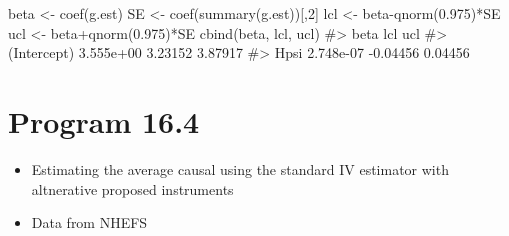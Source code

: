 \documentclass[
  10pt,
  a4paper,
]{book}
\newenvironment{Shaded}{\begin{snugshade}}{\end{snugshade}}
\newcommand{\CommentTok}[1]{\textcolor[rgb]{0.37,0.37,0.37}{#1}}
\newcommand{\DecValTok}[1]{\textcolor[rgb]{0.68,0.00,0.00}{#1}}
\newcommand{\FloatTok}[1]{\textcolor[rgb]{0.68,0.00,0.00}{#1}}
\newcommand{\FunctionTok}[1]{\textcolor[rgb]{0.28,0.35,0.67}{#1}}
\newcommand{\NormalTok}[1]{\textcolor[rgb]{0.00,0.46,0.62}{#1}}
\newcommand{\OtherTok}[1]{\textcolor[rgb]{0.00,0.46,0.62}{#1}}
\newcommand{\SpecialCharTok}[1]{\textcolor[rgb]{0.37,0.37,0.37}{#1}}
\providecommand{\tightlist}{%
  \setlength{\itemsep}{0pt}\setlength{\parskip}{0pt}}
\begin{document}
\begin{Shaded}
\begin{Highlighting}[]
\NormalTok{beta }\OtherTok{\textless{}{-}} \FunctionTok{coef}\NormalTok{(g.est)}
\NormalTok{SE }\OtherTok{\textless{}{-}} \FunctionTok{coef}\NormalTok{(}\FunctionTok{summary}\NormalTok{(g.est))[,}\DecValTok{2}\NormalTok{]}
\NormalTok{lcl }\OtherTok{\textless{}{-}}\NormalTok{ beta}\SpecialCharTok{{-}}\FunctionTok{qnorm}\NormalTok{(}\FloatTok{0.975}\NormalTok{)}\SpecialCharTok{*}\NormalTok{SE}
\NormalTok{ucl }\OtherTok{\textless{}{-}}\NormalTok{ beta}\SpecialCharTok{+}\FunctionTok{qnorm}\NormalTok{(}\FloatTok{0.975}\NormalTok{)}\SpecialCharTok{*}\NormalTok{SE}
\FunctionTok{cbind}\NormalTok{(beta, lcl, ucl)}
\CommentTok{\#\textgreater{}                  beta      lcl     ucl}
\CommentTok{\#\textgreater{} (Intercept) 3.555e+00  3.23152 3.87917}
\CommentTok{\#\textgreater{} Hpsi        2.748e{-}07 {-}0.04456 0.04456}
\end{Highlighting}
\end{Shaded}

\section{Program 16.4}\label{program-16.4}

\begin{itemize}
\tightlist
\item
  Estimating the average causal using the standard IV estimator with altnerative proposed instruments
\item
  Data from NHEFS
\end{itemize}
\end{document}
